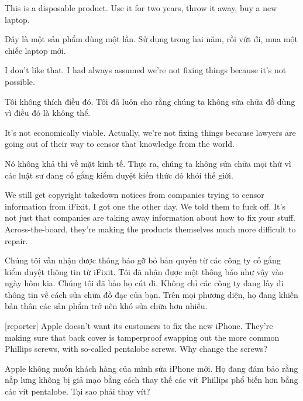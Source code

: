 \documentclass[a4paper]{article}
\begin{document}
	This is a disposable product.
	Use it for two years, throw it away, buy a new laptop.
	
	\begin{vietnamese-v2}
		Đây là một sản phẩm dùng một lần.
		Sử dụng trong hai năm, rồi vứt đi, mua một chiếc laptop mới.
	\end{vietnamese-v2}
	
	I don't like that.
	I had always assumed we're not fixing things because it's not possible.
	
	\begin{vietnamese-v2}
		Tôi không thích điều đó. Tôi đã luôn cho rằng chúng ta không sửa chữa đồ dùng vì điều đó là không thể.
	\end{vietnamese-v2}
	
	It's not economically viable.
	Actually, we're not fixing things because lawyers are going out of their way to censor that knowledge from the world.
	
	\begin{vietnamese-v2}
		Nó không khả thi về mặt kinh tế.
		Thực ra, chúng ta không sửa chữa mọi thứ vì các luật sư đang cố gắng kiểm duyệt kiến thức đó khỏi thế giới.
	\end{vietnamese-v2}
	
	We still get copyright takedown notices from companies trying to censor information from iFixit.
	I got one the other day.
	We told them to fuck off.
	It's not just that companies are taking away information about how to fix your stuff.
	Across-the-board, they're making the products themselves much more difficult to repair.
	
	\begin{vietnamese-v2}
		Chúng tôi vẫn nhận được thông báo gỡ bỏ bản quyền từ các công ty cố gắng kiểm duyệt thông tin từ iFixit.
		Tôi đã nhận được một thông báo như vậy vào ngày hôm kia.
		Chúng tôi đã bảo họ cút đi.
		Không chỉ các công ty đang lấy đi thông tin về cách sửa chữa đồ đạc của bạn.
		Trên mọi phương diện, họ đang khiến bản thân các sản phẩm trở nên khó sửa chữa hơn nhiều.
	\end{vietnamese-v2}
	
	[reporter] Apple doesn't want its customers to fix the new iPhone.
	They're making sure that back cover is tamperproof swapping out the more common Phillips screws, with so-called pentalobe screws.
	Why change the screws?
	
	\begin{vietnamese-v2}
		 Apple không muốn khách hàng của mình sửa iPhone mới.
		Họ đang đảm bảo rằng nắp lưng không bị giả mạo bằng cách thay thế các vít Phillips phổ biến hơn bằng các vít pentalobe.
		Tại sao phải thay vít?
	\end{vietnamese-v2}
	
\end{document}
